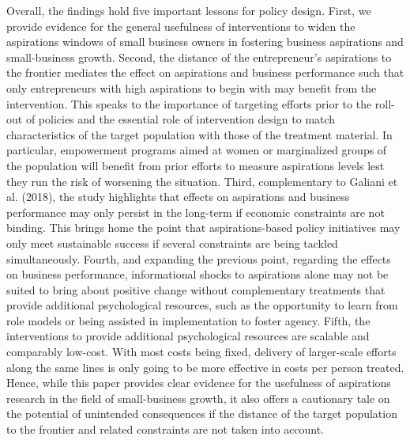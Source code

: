 \documentclass[11.5pt]{article}
\begin{document}
Overall, the findings hold five important lessons for policy design. First, we provide evidence for the general usefulness of interventions to widen the aspirations windows of small business owners in fostering business aspirations and small-business growth. Second, the distance of the entrepreneur's aspirations to the frontier mediates the effect on aspirations and business performance such that only entrepreneurs with high aspirations to begin with may benefit from the intervention. This speaks to the importance of targeting efforts prior to the roll-out of policies and the essential role of intervention design to match characteristics of the target population with those of the treatment material. In particular, empowerment programs aimed at women or marginalized groups of the population will benefit from prior efforts to measure aspirations levels lest they run the risk of worsening the situation. Third, complementary to Galiani et al. (2018), the study highlights that effects on aspirations and business performance may only persist in the long-term if economic constraints are not binding. This brings home the point that aspirations-based policy initiatives may only meet sustainable success if several constraints are being tackled simultaneously. Fourth, and expanding the previous point, regarding the effects on business performance, informational shocks to aspirations alone may not be suited to bring about positive change without complementary treatments that provide additional psychological resources, such as the opportunity to learn from role models or being assisted in implementation to foster agency. Fifth, the interventions to provide additional psychological resources are scalable and comparably low-cost. With most costs being fixed, delivery of larger-scale efforts along the same lines is only going to be more effective in costs per person treated. Hence, while this paper provides clear evidence for the usefulness of aspirations research in the field of small-business growth, it also offers a cautionary tale on the potential of unintended consequences if the distance of the target population to the frontier and related constraints are not taken into account. %




\pagebreak


\end{document}
